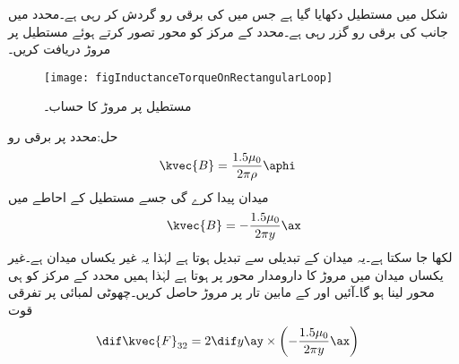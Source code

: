 
شکل  میں مستطیل دکھایا گیا ہے جس میں  کی برقی رو گردش کر رہی ہے۔محدد  میں  جانب  کی برقی رو گزر رہی ہے۔محدد کے مرکز کو محور تصور کرتے ہوئے مستطیل پر مروڑ دریافت کریں۔
\begin{figure}
\centering
\texttt{[image: figInductanceTorqueOnRectangularLoop]}
\caption{مستطیل پر مروڑ کا حساب۔}
\label{شکل_امالہ_مروڑ_مستطیل}
\end{figure}

حل:محدد  پر برقی رو
\begin{align*}
\kvec{B}&=\frac{1.5 \mu_0}{2\pi \rho}\aphi
\end{align*}
میدان پیدا کرے گی جسے مستطیل کے احاطے میں
\begin{align*}
\kvec{B}=-\frac{1.5\mu_0}{2\pi y}\ax
\end{align*}
لکھا جا سکتا ہے۔یہ میدان  کے تبدیلی سے تبدیل ہوتا ہے لہٰذا یہ غیر یکساں میدان ہے۔غیر یکساں میدان میں مروڑ کا دارومدار محور پر ہوتا ہے لہٰذا ہمیں محدد کے مرکز  کو ہی محور لینا ہو گا۔آئیں  اور  کے مابین تار پر مروڑ حاصل کریں۔چھوٹی لمبائی  پر تفرقی قوت 
\begin{align*}
\dif \kvec{F}_{32}&=2 \dif y \ay \times \left(-\frac{1.5\mu_0}{2\pi y}\ax \right)
\end{align*} 
